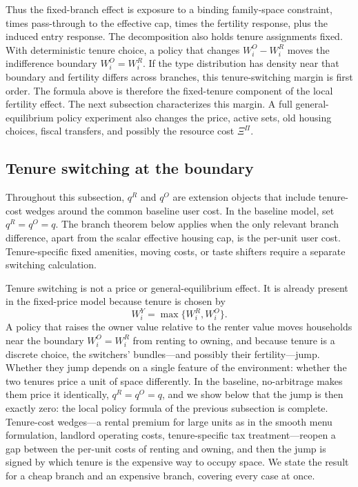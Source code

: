 \documentclass[11pt]{article}
\newcommand{\1}{\mathbf 1}
\begin{document}
Thus the fixed-branch effect is exposure to a binding family-space constraint, times pass-through to the effective cap, times the fertility response, plus the induced entry response. The decomposition also holds tenure assignments fixed. With deterministic tenure choice, a policy that changes $W_i^O-W_i^R$ moves the indifference boundary $W_i^O=W_i^R$. If the type distribution has density near that boundary and fertility differs across branches, this tenure-switching margin is first order. The formula above is therefore the fixed-tenure component of the local fertility effect. The next subsection characterizes this margin. A full general-equilibrium policy experiment also changes the price, active sets, old housing choices, fiscal transfers, and possibly the resource cost $\Xi^\Pi$.

\subsection{Tenure switching at the boundary}
\label{sec:switching}

Throughout this subsection, $q^R$ and $q^O$ are extension objects that include tenure-cost wedges around the common baseline user cost. In the baseline model, set $q^R=q^O=q$. The branch theorem below applies when the only relevant branch difference, apart from the scalar effective housing cap, is the per-unit user cost. Tenure-specific fixed amenities, moving costs, or taste shifters require a separate switching calculation.

Tenure switching is not a price or general-equilibrium effect. It is already present in the fixed-price model because tenure is chosen by
\[
W_i^Y=\max\{W_i^R,W_i^O\}.
\]
A policy that raises the owner value relative to the renter value moves households near the boundary $W_i^O=W_i^R$ from renting to owning, and because tenure is a discrete choice, the switchers' bundles---and possibly their fertility---jump. Whether they jump depends on a single feature of the environment: whether the two tenures price a unit of space differently. In the baseline, no-arbitrage makes them price it identically, $q^R=q^O=q$, and we show below that the jump is then exactly zero: the local policy formula of the previous subsection is complete. Tenure-cost wedges---a rental premium for large units as in the smooth menu formulation, landlord operating costs, tenure-specific tax treatment---reopen a gap between the per-unit costs of renting and owning, and then the jump is signed by which tenure is the expensive way to occupy space. We state the result for a cheap branch and an expensive branch, covering every case at once.
\end{document}
